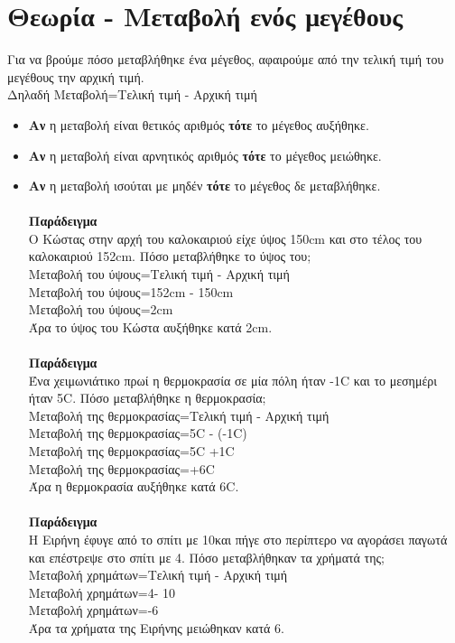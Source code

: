 \documentclass[a4paper,10pt]{report}
\begin{document}
\section*{Θεωρία - Μεταβολή ενός μεγέθους\hfill \small{}}
Για να βρούμε πόσο μεταβλήθηκε ένα μέγεθος, αφαιρούμε από την τελική τιμή του μεγέθους την αρχική τιμή.\\
Δηλαδή Μεταβολή=Τελική τιμή - Αρχική τιμή
\begin{itemize}
 \item \textbf{Αν} η μεταβολή είναι θετικός αριθμός  \textbf{τότε} το μέγεθος αυξήθηκε.
 \item \textbf{Αν} η μεταβολή είναι αρνητικός αριθμός  \textbf{τότε} το μέγεθος μειώθηκε.
 \item \textbf{Αν} η μεταβολή ισούται με μηδέν  \textbf{τότε} το μέγεθος δε μεταβλήθηκε.\\ \\
       \textbf{Παράδειγμα}\\ Ο Κώστας στην αρχή του καλοκαιριού είχε ύψος 150cm και στο τέλος του 
                    καλοκαιριού 152cm. Πόσο μεταβλήθηκε το ύψος του;\\
       Μεταβολή του ύψους=Τελική τιμή - Αρχική τιμή\\
       Μεταβολή του ύψους=152cm - 150cm\\
       Μεταβολή του ύψους=2cm\\
       Άρα το ύψος του Κώστα αυξήθηκε κατά 2cm.\\ \\
        \textbf{Παράδειγμα}\\ Ένα χειμωνιάτικο πρωί η θερμοκρασία σε μία πόλη ήταν -1\textdegree C και το  
                              μεσημέρι ήταν 5\textdegree C. Πόσο μεταβλήθηκε η θερμοκρασία;\\
       Μεταβολή της θερμοκρασίας=Τελική τιμή - Αρχική τιμή\\
       Μεταβολή της θερμοκρασίας=5\textdegree C - (-1\textdegree C)\\
       Μεταβολή της θερμοκρασίας=5\textdegree C +1\textdegree C\\
       Μεταβολή της θερμοκρασίας=+6\textdegree C\\
       Άρα η θερμοκρασία αυξήθηκε κατά 6\textdegree C. \\ \\
\textbf{Παράδειγμα}\\ Η Ειρήνη έφυγε από το σπίτι με 10\texteuro και πήγε στο περίπτερο να αγοράσει παγωτά και 
                    επέστρεψε στο σπίτι με 4\texteuro. Πόσο μεταβλήθηκαν τα χρήματά της;\\
       Μεταβολή χρημάτων=Τελική τιμή - Αρχική τιμή\\
       Μεταβολή χρημάτων=4\texteuro - 10\texteuro\\
       Μεταβολή χρημάτων=-6\texteuro\\
       Άρα τα χρήματα της Ειρήνης μειώθηκαν κατά 6\texteuro.
\end{itemize}
\end{document}
